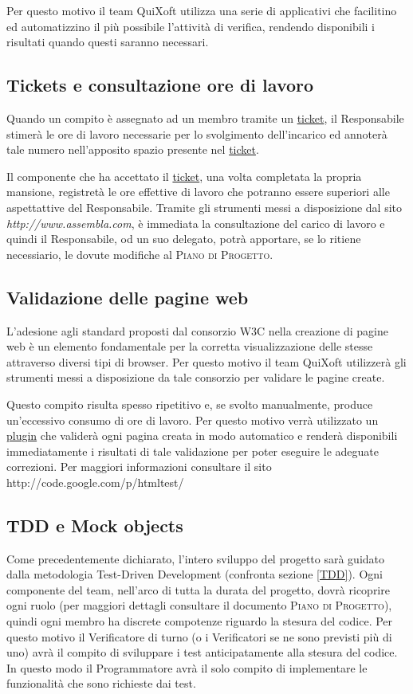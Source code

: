 \documentclass[11pt,a4paper]{article}
\begin{document}
Per questo motivo il team QuiXoft utilizza una serie di applicativi che facilitino ed automatizzino il più possibile l'attività di verifica, rendendo disponibili i risultati quando questi saranno necessari.

\subsection{Tickets e consultazione ore di lavoro}
Quando un compito è assegnato ad un membro tramite un \underline{ticket}, il Responsabile stimerà le ore di lavoro necessarie per lo svolgimento dell'incarico ed annoterà tale numero nell'apposito spazio presente nel \underline{ticket}.

Il componente che ha accettato il \underline{ticket}, una volta completata la propria mansione, registretà le ore effettive di lavoro che potranno essere superiori alle aspettattive del Responsabile. Tramite gli strumenti messi a disposizione dal sito \textit{http://www.assembla.com}, è immediata la consultazione del carico di lavoro e quindi il Responsabile, od un suo delegato, potrà apportare, se lo ritiene necessiario, le dovute modifiche al \textsc{Piano di Progetto}.

\subsection{Validazione delle pagine web}
L'adesione agli standard proposti dal consorzio W3C nella creazione di pagine web è un elemento fondamentale per la corretta visualizzazione delle stesse attraverso diversi tipi di browser. Per questo motivo il team QuiXoft utilizzerà gli strumenti messi a disposizione da tale consorzio per validare le pagine create.

Questo compito risulta spesso ripetitivo e, se svolto manualmente, produce un'eccessivo consumo di ore di lavoro. Per questo motivo verrà utilizzato un \underline{plugin} che validerà ogni pagina creata in modo automatico e renderà disponibili immediatamente i risultati di tale validazione per poter eseguire le adeguate correzioni. Per maggiori informazioni consultare il sito http://code.google.com/p/htmltest/

\subsection{TDD e Mock objects }
Come precedentemente dichiarato, l'intero sviluppo del progetto sarà guidato dalla metodologia Test-Driven Development (confronta sezione \ref{TDD}). Ogni componente del team, nell'arco di tutta la durata del progetto, dovrà ricoprire ogni ruolo (per maggiori dettagli consultare il documento \textsc{Piano di Progetto}), quindi ogni membro ha discrete compotenze riguardo la stesura del codice. Per questo motivo il Verificatore di turno (o i Verificatori se ne sono previsti più di uno) avrà il compito di sviluppare i test anticipatamente alla stesura del codice. In questo modo il Programmatore avrà il solo compito di implementare le funzionalità che sono richieste dai test.
\end{document}
